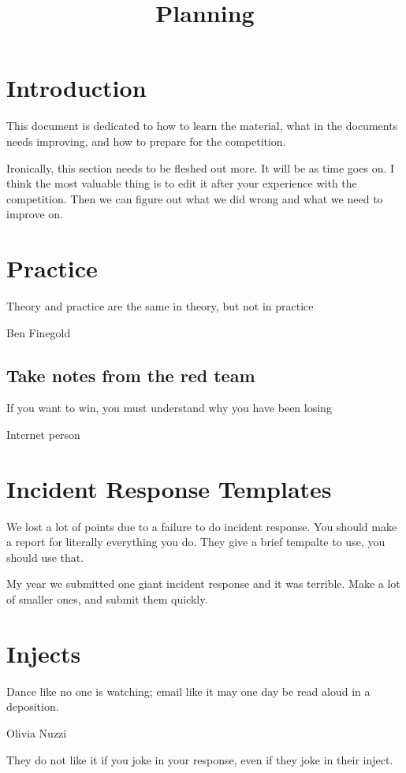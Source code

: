 \documentclass{article}
\title{Planning}
\begin{document}
\maketitle

\graphicspath{ {./Images/} }
\tableofcontents

\section{Introduction}
This document is dedicated to how to learn the material, what in the 
documents needs improving, and how to prepare for the competition.

Ironically, this section needs to be fleshed out more. 
It will be as time goes on. I think the most valuable thing is to edit it after your experience with the competition.
Then we can figure out what we did wrong and what we need to improve on.

\section{Practice}
\epigraph{Theory and practice are the same in theory, but not in practice}{Ben Finegold}

\subsection{Take notes from the red team}
\epigraph{If you want to win, you must understand why you have been losing}{Internet person}

\section{Incident Response Templates}
We lost a lot of points due to a failure to do incident response. You should make a report for literally everything you do.
They give a brief tempalte to use, you should use that.

My year we submitted one giant incident response and it was terrible. Make a lot of smaller ones, and submit them quickly.

\section{Injects}
\epigraph{Dance like no one is watching; email like it may one day be read aloud in a deposition.}{Olivia Nuzzi}

They do not like it if you joke in your response, even if they joke in their inject.
\end{document}

